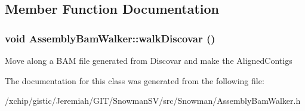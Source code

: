 \subsection{Member Function Documentation}
\subsubsection{\setlength{\rightskip}{0pt plus 5cm}void Assembly\-Bam\-Walker::walk\-Discovar ()}\label{classAssemblyBamWalker_bcf3591cf7761d733c6844207819453a}


Move along a BAM file generated from Discovar and make the Aligned\-Contigs 

The documentation for this class was generated from the following file:\begin{CompactItemize}
\item 
/xchip/gistic/Jeremiah/GIT/Snowman\-SV/src/Snowman/Assembly\-Bam\-Walker.h\end{CompactItemize}
